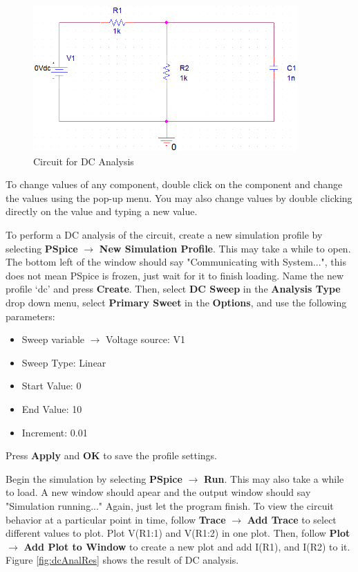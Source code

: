 \documentclass[12pt]{../manual}
\begin{document}
\begin{figure}[ht!]
	\begin{center}
		\includegraphics[width=0.9\textwidth]{figures/DCAnalysisCircuitCrop.PNG}
	\end{center}
	\caption{Circuit for DC Analysis}
	\label{fig:dc}
\end{figure}

To change values of any component, double click on the component and change the values using the pop-up menu. You may also change values by double clicking directly on the value and typing a new value.

To perform a DC analysis of the circuit, create a new simulation profile by selecting \textbf{PSpice} $\to$ \textbf{New Simulation Profile}. This may take a while to open. The bottom left of the window should say "Communicating with System...", this does not mean PSpice is frozen, just wait for it to finish loading. Name the new profile `dc' and press \textbf{Create}. Then,  select \textbf{DC Sweep} in the \textbf{Analysis Type} drop down menu, select \textbf{Primary Sweet} in the \textbf{Options}, and use the following parameters:
\begin{itemize}
\item Sweep variable $\to$ Voltage source: V1
\item Sweep Type: Linear
\item Start Value: 0
\item End Value: 10
\item Increment: 0.01
\end{itemize}

Press \textbf{Apply} and \textbf{OK} to save the profile settings. 

Begin the simulation by selecting \textbf{PSpice} $\to$ \textbf{Run}. This may also take a while to load. A new window should apear and the output window should say "Simulation running..." Again, just let the program finish. To view the circuit behavior at a particular point in time, follow \textbf{Trace} $\to$ \textbf{Add Trace} to select different values to plot. Plot V(R1:1) and V(R1:2) in one plot. Then, follow \textbf{Plot} $\to$ \textbf{Add Plot to Window} to create a new plot and add I(R1), and I(R2) to it. Figure \ref{fig:dcAnalRes} shows the result of DC analysis.
\end{document}
